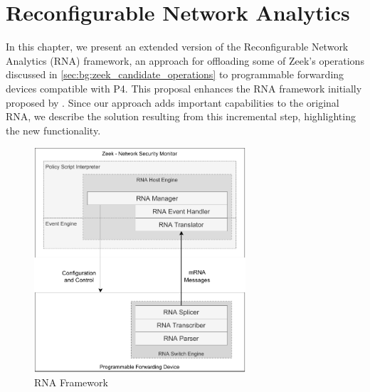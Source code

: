\chapter{Reconfigurable Network Analytics}
\label{cap:rna}



In this chapter, we present an extended version of the Reconfigurable Network Analytics (RNA) framework, an approach for offloading some of Zeek's operations discussed in \autoref{sec:bg:zeek_candidate_operations} to programmable forwarding devices compatible with P4. This proposal enhances the RNA framework initially proposed by . Since our approach adds important capabilities to the original RNA, we describe the solution resulting from this incremental step, highlighting the new functionality.

\begin{figure}[h]
    \caption{RNA Framework}
    \begin{center}
        \includegraphics[width=0.7\textwidth]{images/arch_high_level.pdf}  
    \end{center}
    \label{fig:arch_high_level}
\end{figure}


